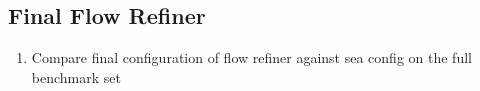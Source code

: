 \subsection{Final Flow Refiner}

\begin{enumerate}
\item Compare final configuration of flow refiner against sea config on the full benchmark set
\end{enumerate}



